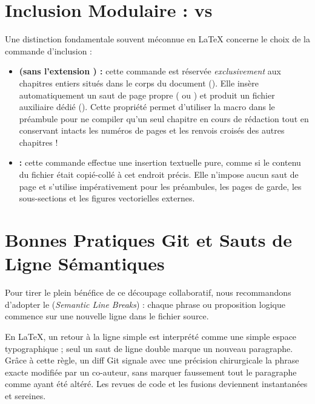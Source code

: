 \section{Inclusion Modulaire :  vs }
\label{sec:include-vs-input}

Une distinction fondamentale souvent méconnue en \LaTeX{} concerne le choix de la commande d'inclusion :

\begin{itemize}
  \item \textbf{ (sans l'extension ) :}
  cette commande est réservée \emph{exclusivement} aux chapitres entiers situés dans le corps du document ().
  Elle insère automatiquement un saut de page propre ( ou )
  et produit un fichier auxiliaire dédié ().
  Cette propriété permet d'utiliser la macro  dans le préambule
  pour ne compiler qu'un seul chapitre en cours de rédaction tout en conservant intacts les numéros de pages
  et les renvois croisés des autres chapitres !
  \item \textbf{ :}
  cette commande effectue une insertion textuelle pure, comme si le contenu du fichier était copié-collé à cet endroit précis.
  Elle n'impose aucun saut de page et s'utilise impérativement pour les préambules,
  les pages de garde, les sous-sections et les figures vectorielles externes.
\end{itemize}

\section{Bonnes Pratiques Git et Sauts de Ligne Sémantiques}
\label{sec:git-semantique}

Pour tirer le plein bénéfice de ce découpage collaboratif,
nous recommandons d'adopter le  (\textit{Semantic Line Breaks}) :
chaque phrase ou proposition logique commence sur une nouvelle ligne dans le fichier source.

En \LaTeX{}, un retour à la ligne simple est interprété comme une simple espace typographique ;
seul un saut de ligne double marque un nouveau paragraphe.
Grâce à cette règle, un diff Git signale avec une précision chirurgicale la phrase exacte modifiée par un co-auteur,
sans marquer faussement tout le paragraphe comme ayant été altéré.
Les revues de code et les fusions deviennent instantanées et sereines.
